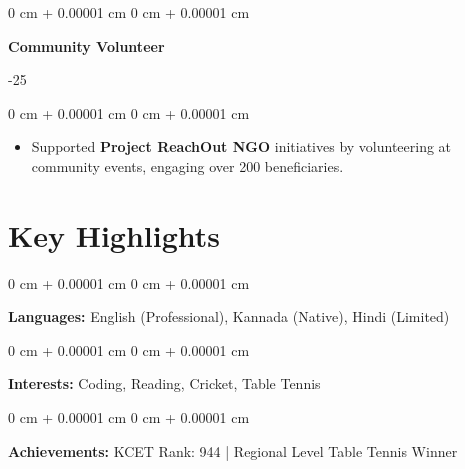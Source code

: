 \documentclass[10pt, letterpaper]{article}
\newenvironment{highlights}{
    \begin{itemize}[
        topsep=0.10 cm,
        parsep=0.10 cm,
        partopsep=0pt,
        itemsep=0pt,
        leftmargin=0 cm + 10pt
    ]
}{
    \end{itemize}
} %
\newenvironment{onecolentry}{
    \begin{adjustwidth}{
        0 cm + 0.00001 cm
    }{
        0 cm + 0.00001 cm
    }
}{
    \end{adjustwidth}
} %
\newenvironment{twocolentry}[2][]{
    \onecolentry
    \def\secondColumn{#2}
    \setcolumnwidth{\fill, 4.5 cm}
    \begin{paracol}{2}
}{
    \switchcolumn \raggedleft \secondColumn
    \end{paracol}
    \endonecolentry
} %
\begin{document}
\vspace{0.2 cm}

\begin{twocolentry}{
    2024-25
}
    \textbf{\textcolor{blueHighlight}{Community Volunteer}}
\end{twocolentry}

\vspace{0.05 cm}
\begin{onecolentry}
    \begin{highlights}
        \item Supported \textbf{Project ReachOut NGO} initiatives by volunteering at community events, engaging over 200 beneficiaries.
    \end{highlights}
\end{onecolentry}
    \section{Key Highlights}

        \begin{onecolentry}
            \textbf{Languages:} English (Professional), Kannada (Native), Hindi (Limited)
        \end{onecolentry}

        \vspace{0.2 cm}

        \begin{onecolentry}
            \textbf{Interests:} Coding, Reading, Cricket, Table Tennis
        \end{onecolentry}

        \vspace{0.2 cm}

        \begin{onecolentry}
            \textbf{Achievements:} KCET Rank: 944 | Regional Level Table Tennis Winner
        \end{onecolentry}
   
\end{document}
